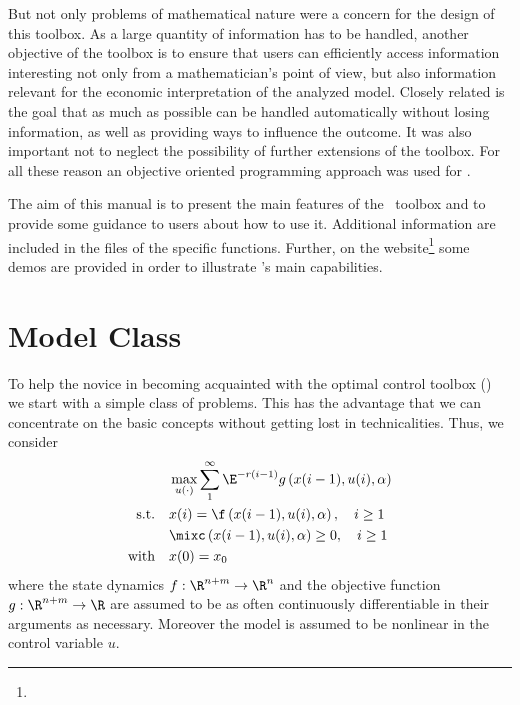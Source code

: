 But not only problems of mathematical nature were a concern for the design of this toolbox. As a large quantity of information has to be handled, another objective of the toolbox is to ensure that users can efficiently access information interesting not only from a mathematician's point of view, but also information relevant for the economic interpretation of the analyzed model. Closely related is the goal that as much as possible can be handled automatically without losing information, as well as providing ways to influence the outcome. It was also important not to neglect the possibility of further extensions of the toolbox. For all these reason an objective oriented programming approach was used for \OCMAT.

The aim of this manual is to present the main features of the \OCMAT\ toolbox and to provide some guidance to users about how to use it. Additional information are included in the files of the specific functions. Further, on the website\footnote{\httpOCMAT} some demos are provided in order to illustrate \OCMAT's main capabilities.

\section{Model Class}
To help the novice in becoming acquainted with the optimal control toolbox (\OCMAT) we start with a simple class of problems. This has the advantage that we can concentrate on the basic concepts without getting lost in technicalities. Thus, we consider 
\begin{subequations}
\label{eq:simple_dis_opt_pro}
\begin{align}
& \max_{u(\cdot)}\sum_1^\infty\E^{-r(i-1)}g\left(x(i-1),u(i),\modelpar\right)\label{eq:simple_dis_opt_pro_obj}\\
\text{s.t.}\quad & x(i) =\f\left(x(i-1),u(i),\modelpar\right),\quad i\ge1\label{eq:simple_dis_opt_pro_dyn}\\
& \mixc\left(x(i-1),u(i),\modelpar\right)\ge0,\quad i\ge1\label{eq:simple_dis_opt_pro_mc}\\
\text{with}\quad & x(0) = x_0\label{eq:simple_dis_opt_pro_init}
\end{align}
\end{subequations}
where the state dynamics $f:\R^{n+m}\rightarrow\R^n$ and the objective function $g:\R^{n+m}\rightarrow\R$ are assumed to be as often continuously differentiable in their arguments as necessary. Moreover the model is assumed to be nonlinear in the control variable $u$.
